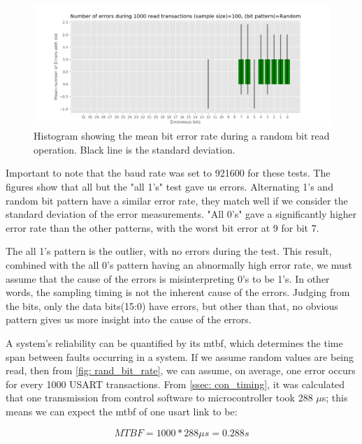 \documentclass[main.tex]{subfiles}
\begin{document}
\begin{figure}[!ht]
    \centering
    \includegraphics[width=18cm]{images/error_rate_random.png}
    \caption{Histogram showing the mean bit error rate during a random bit read operation. Black line is the standard deviation.}
    \label{fig: rand_bit_rate}
\end{figure}
\FloatBarrier

Important to note that the baud rate was set to 921600 for these tests. The figures show that all but the "all 1's" test gave us errors. Alternating 1's and random bit pattern have a similar error rate, they match well if we consider the standard deviation of the error measurements. "All 0's" gave a significantly higher error rate than the other patterns, with the worst bit error at 9 for bit 7.


The all 1's pattern is the outlier, with no errors during the test. This result, combined with the all 0's pattern having an abnormally high error rate, we must assume that the cause of the errors is misinterpreting 0's to be 1's. In other words, the sampling timing is not the inherent cause of the errors. Judging from the bits, only the data bits(15:0) have errors, but other than that, no obvious pattern gives us more insight into the cause of the errors.

A system's reliability can be quantified by its \gls{mtbf}, which determines the time span between faults occurring in a system\cite{mtbf_intro}. If we assume random values are being read, then from \autoref{fig: rand_bit_rate}, we can assume, on average, one error occurs for every 1000 USART transactions. From \autoref{ssec: con_timing}, it was calculated that one transmission from control software to microcontroller took 288 $\mu$s; this means we can expect the \gls{mtbf} of one \gls{usart} link to be:

\begin{equation} \label{eqn:single_mtbf}
MTBF = 1000*288\mu s = 0.288 s
\end{equation}
\end{document}
